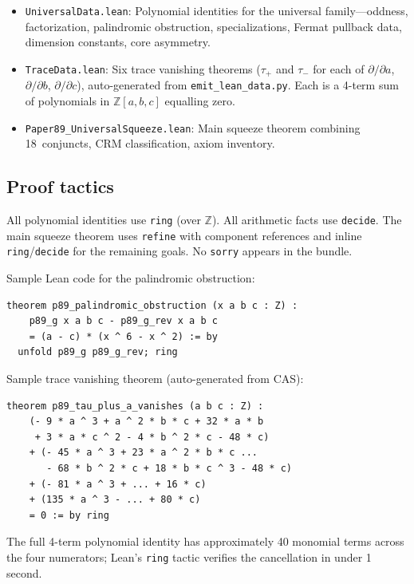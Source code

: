 \documentclass[11pt,a4paper]{article}
\theoremstyle{definition}
\theoremstyle{remark}
\newcommand{\ZZ}{\mathbb{Z}}
\begin{document}
\begin{itemize}[nosep]
  \item \texttt{UniversalData.lean}: Polynomial identities for the universal
        family---oddness, factorization, palindromic obstruction, specializations,
        Fermat pullback data, dimension constants, core asymmetry.
  \item \texttt{TraceData.lean}: Six trace vanishing theorems
        ($\tau_+$ and $\tau_-$ for each of $\partial/\partial a$,
        $\partial/\partial b$, $\partial/\partial c$), auto-generated from
        \texttt{emit\_lean\_data.py}.
        Each is a 4-term sum of polynomials in $\ZZ[a,b,c]$ equalling zero.
  \item \texttt{Paper89\_UniversalSqueeze.lean}: Main squeeze theorem combining
        18~conjuncts, CRM classification, axiom inventory.
\end{itemize}

\subsection{Proof tactics}

All polynomial identities use \texttt{ring} (over $\ZZ$).
All arithmetic facts use \texttt{decide}.
The main squeeze theorem uses \texttt{refine} with component references
and inline \texttt{ring}/\texttt{decide} for the remaining goals.
No \texttt{sorry} appears in the bundle.

\medskip\noindent
Sample Lean code for the palindromic obstruction:
\begin{verbatim}
theorem p89_palindromic_obstruction (x a b c : Z) :
    p89_g x a b c - p89_g_rev x a b c
    = (a - c) * (x ^ 6 - x ^ 2) := by
  unfold p89_g p89_g_rev; ring
\end{verbatim}

\noindent
Sample trace vanishing theorem (auto-generated from CAS):
\begin{verbatim}
theorem p89_tau_plus_a_vanishes (a b c : Z) :
    (- 9 * a ^ 3 + a ^ 2 * b * c + 32 * a * b
     + 3 * a * c ^ 2 - 4 * b ^ 2 * c - 48 * c)
    + (- 45 * a ^ 3 + 23 * a ^ 2 * b * c ...
       - 68 * b ^ 2 * c + 18 * b * c ^ 3 - 48 * c)
    + (- 81 * a ^ 3 + ... + 16 * c)
    + (135 * a ^ 3 - ... + 80 * c)
    = 0 := by ring
\end{verbatim}
The full 4-term polynomial identity has approximately 40 monomial terms
across the four numerators; Lean's \texttt{ring} tactic verifies the
cancellation in under 1 second.
\end{document}
